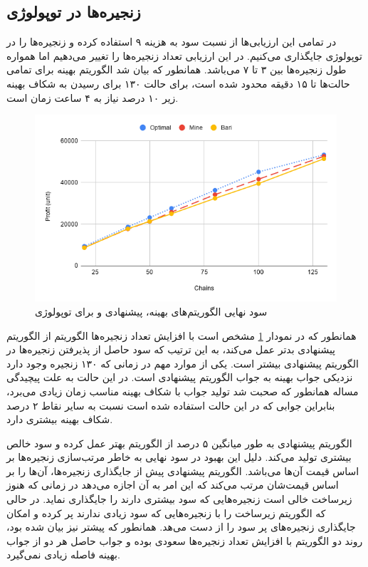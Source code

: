 \subsection{زنجیره‌ها در توپولوژی }

در تمامی این ارزیابی‌ها از نسبت سود به هزینه ۹ استفاده کرده و زنجیره‌ها را در توپولوژی  جایگذاری می‌کنیم.
در این ارزیابی تعداد زنجیره‌ها را تغییر می‌دهیم اما همواره طول زنجیره‌ها بین ۳ تا ۷ می‌باشد.
همانطور که بیان شد الگوریتم بهینه برای تمامی حالت‌ها تا ۱۵ دقیقه محدود شده است، برای حالت ۱۳۰ برای رسیدن به شکاف بهینه زیر ۱۰ درصد نیاز به ۴ ساعت زمان است.


\begin{figure}[h!]
\center\includegraphics[scale=.5]{images/chart-2}
\caption{سود نهایی الگوریتم‌های بهینه، پیشنهادی و \cite{Bari2015} برای توپولوژی }
\label{fig.7}
\end{figure}

همانطور که در نمودار \ref{fig.7} مشخص است با افزایش تعداد زنجیره‌ها الگوریتم \cite{Bari2015} از الگوریتم پیشنهادی بدتر عمل می‌کند،
به این ترتیب که سود حاصل از پذیرفتن زنجیره‌ها در الگوریتم پیشنهادی بیشتر است.
یکی از موارد مهم در زمانی که ۱۳۰ زنجیره وجود دارد نزدیکی جواب بهینه به جواب الگوریتم پیشنهادی است.
در این حالت به علت پیچیدگی مساله همانطور که صحبت شد تولید جواب با شکاف بهینه مناسب زمان زیادی می‌برد،
بنابراین جوابی که در این حالت استفاده شده است نسبت به سایر نقاط ۲ درصد شکاف بهینه بیشتری دارد.

الگوریتم پیشنهادی به طور میانگین ۵ درصد از الگوریتم \cite{Bari2015}
بهتر عمل کرده و سود خالص بیشتری تولید می‌کند.
دلیل این بهبود در سود نهایی به خاطر مرتب‌سازی زنجیره‌ها بر اساس قیمت آن‌ها می‌باشد.
الگوریتم پیشنهادی پیش از جایگذاری زنجیره‌ها، آن‌ها را بر اساس قیمت‌شان مرتب می‌کند
که این امر به آن اجازه می‌دهد در زمانی که هنوز زیرساخت خالی است زنجیره‌هایی که سود بیشتری دارند را جایگذاری نماید.
در حالی که الگوریتم \cite{Bari2015}
زیرساخت را با زنجیره‌هایی که سود زیادی ندارند پر کرده و امکان جایگذاری زنجیره‌های پر سود را از دست می‌هد.
همانطور که پیشتر نیز بیان شده بود، روند دو الگوریتم با افزایش تعداد زنجیره‌ها سعودی بوده و جواب حاصل هر دو از جواب بهینه فاصله
زیادی نمی‌گیرد.


